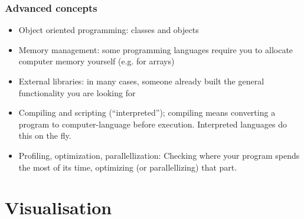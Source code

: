 \documentclass[11pt,table,final,fleqn,xcolor={usenames,dvipsnames}]{beamer}
\begin{document}
% 
\begin{frame}
 \frametitle{Advanced concepts}
 \begin{itemize}
   \item Object oriented programming: classes and objects
   \item Memory management: some programming languages require you to allocate computer memory yourself (e.g. for arrays)
   \item External libraries: in many cases, someone already built the general functionality you are looking for
   \item Compiling and scripting (``interpreted''); compiling means converting a program to computer-language before execution. Interpreted languages do this on the fly.
   \item Profiling, optimization, parallellization: Checking where your program spends the most of its time, optimizing (or parallellizing) that part.
 \end{itemize}
\end{frame}
% 
% 
\section{Visualisation}
\end{document}
